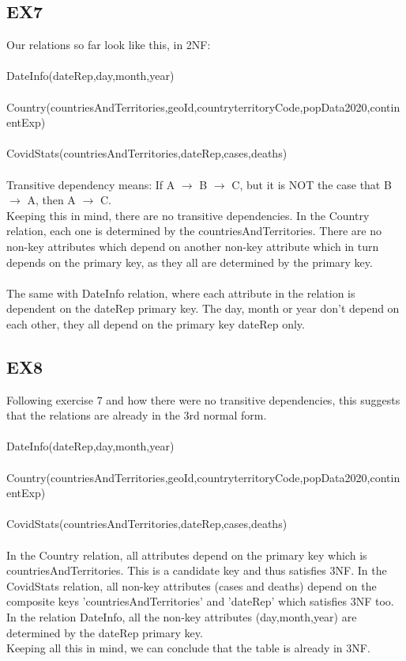 \documentclass[]{article}
\begin{document}
\subsection{EX7}
Our relations so far look like this, in 2NF:\\
\\DateInfo(dateRep,day,month,year)\\
\\Country(countriesAndTerritories,geoId,countryterritoryCode,popData2020,continentExp)\\
\\CovidStats(countriesAndTerritories,dateRep,cases,deaths)\\
\\Transitive dependency means: If A $\rightarrow$ B $\rightarrow$ C, but it is NOT the case that B $\rightarrow$ A, then A $\rightarrow$ C.\\
Keeping this in mind, there are no transitive dependencies. In the Country relation, each one is determined by the countriesAndTerritories. There are no non-key attributes which depend on another non-key attribute which in turn depends on the primary key, as they all are determined by the primary key.\\\\
The same with DateInfo relation, where each attribute in the relation is dependent on the dateRep primary key. The day, month or year don't depend on each other, they all depend on the primary key dateRep only.

\subsection{EX8}
Following exercise 7 and how there were no transitive dependencies, this suggests that the relations are already in the 3rd normal form.\\
\\DateInfo(dateRep,day,month,year)\\
\\Country(countriesAndTerritories,geoId,countryterritoryCode,popData2020,continentExp)\\
\\CovidStats(countriesAndTerritories,dateRep,cases,deaths)\\\\
In the Country relation, all attributes depend on the primary key which is countriesAndTerritories. This is a candidate key and thus satisfies 3NF. In the CovidStats relation, all non-key attributes (cases and deaths) depend on the composite keys 'countriesAndTerritories' and 'dateRep' which satisfies 3NF too. In the relation DateInfo, all the non-key attributes (day,month,year) are determined by the dateRep primary key.\\
Keeping all this in mind, we can conclude that the table is already in 3NF.
\end{document}
